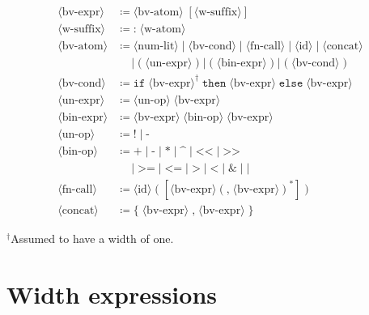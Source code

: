 \documentclass[letterpaper]{article}
\begin{document}
\begin{align*}
\langle\text{bv-expr}\rangle
  &\coloneqq \langle\text{bv-atom}\rangle\;[\langle\text{w-suffix}\rangle] \\
\langle\text{w-suffix}\rangle
  &\coloneqq \texttt{:}\;\langle\text{w-atom}\rangle \\
\langle\text{bv-atom}\rangle
  &\coloneqq \langle\text{num-lit}\rangle
      \mid \langle\text{bv-cond}\rangle
      \mid \langle\text{fn-call}\rangle
      \mid \langle\text{id}\rangle
      \mid \langle\text{concat}\rangle \\
  &\quad\mid \texttt{(}\;\langle\text{un-expr}\rangle\;\texttt{)}
      \mid \texttt{(}\;\langle\text{bin-expr}\rangle\;\texttt{)}
      \mid \texttt{(}\;\langle\text{bv-cond}\rangle\;\texttt{)} \\
\langle\text{bv-cond}\rangle
  &\coloneqq \texttt{if}\;\langle\text{bv-expr}\rangle^\dagger\;\texttt{then}\;
      \langle\text{bv-expr}\rangle\;\texttt{else}\;\langle\text{bv-expr}\rangle \\
\langle\text{un-expr}\rangle
  &\coloneqq \langle\text{un-op}\rangle\;\langle\text{bv-expr}\rangle \\
\langle\text{bin-expr}\rangle
  &\coloneqq \langle\text{bv-expr}\rangle\;\langle\text{bin-op}\rangle\;
      \langle\text{bv-expr}\rangle \\
\langle\text{un-op}\rangle
  &\coloneqq \texttt{!} \mid \texttt{-} \\
\langle\text{bin-op}\rangle
  &\coloneqq \texttt{+} \mid \texttt{-} \mid \texttt{*} \mid \texttt{\textasciicircum}
      \mid \texttt{<<} \mid \texttt{>>} \\
  &\quad\mid \texttt{>=} \mid \texttt{<=} \mid \texttt{>} \mid \texttt{<}
      \mid \texttt{\&} \mid \texttt{|} \\
\langle\text{fn-call}\rangle
  &\coloneqq \langle\text{id}\rangle\;\texttt{(}\;
      [\langle\text{bv-expr}\rangle(\texttt{,}\;\langle\text{bv-expr}\rangle)^*]
      \;\texttt{)} \\
\langle\text{concat}\rangle
  &\coloneqq \texttt{\{}\;\langle\text{bv-expr}\rangle\;\texttt{,}\;\langle\text{bv-expr}\rangle\;\texttt{\}}
\end{align*}

$^\dagger$Assumed to have a width of one.

\section*{Width expressions}
\end{document}
